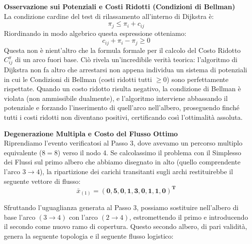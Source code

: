 \documentclass[12pt, a4paper]{article}
\newcommand{\separatore}{\noindent{\color{titlecolor!50}\rule{\textwidth}{0.6pt}}}
\begin{document}
	\textbf{Osservazione sui Potenziali e Costi Ridotti (Condizioni di Bellman)}\\
	La condizione cardine del test di rilassamento all'interno di Dijkstra è:
	\[ \pi_j \le \pi_i + c_{ij} \]
	Riordinando in modo algebrico questa espressione otteniamo:
	\[ c_{ij} + \pi_i - \pi_j \ge 0 \]
	Questa non è nient'altro che la formula formale per il calcolo del Costo Ridotto $C^\pi_{ij}$ di un arco fuori base. 
	Ciò rivela un'incredibile verità teorica: l'algoritmo di Dijkstra non fa altro che arrestarsi non appena individua un sistema di potenziali in cui le Condizioni di Bellman (costi ridotti tutti $\ge 0$) sono perfettamente rispettate. Quando un costo ridotto risulta negativo, la condizione di Bellman è violata (non ammissibile dualmente), e l'algoritmo interviene abbassando il potenziale e forzando l'inserimento di quell'arco nell'albero, proseguendo finché tutti i costi ridotti non diventano positivi, certificando così l'ottimalità assoluta.
	
	\vspace{0.6cm}
	\separatore
	\vspace{0.4cm}
	
	\textbf{Degenerazione Multipla e Costo del Flusso Ottimo}\\
	Riprendiamo l'evento verificatosi al Passo 3, dove avevamo un percorso multiplo equivalente ($8 = 8$) verso il nodo 4. 
	Se calcolassimo il problema con il Simplesso dei Flussi sul primo albero che abbiamo disegnato in alto (quello comprendente l'arco $3\to4$), la ripartizione dei carichi transitanti sugli archi restituirebbe il seguente vettore di flusso:
	\[ \bar{x}_{(1)} = \mathbf{(0, 5, 0, 1, 3, 0, 1, 1, 0)^T} \]
	
	Sfruttando l'uguaglianza generata al Passo 3, possiamo sostituire nell'albero di base l'arco $(3\to4)$ con l'arco $(2\to4)$, estromettendo il primo e introducendo il secondo come nuovo ramo di copertura. Questo secondo albero, di pari validità, genera la seguente topologia e il seguente flusso logistico:
	
\end{document}
